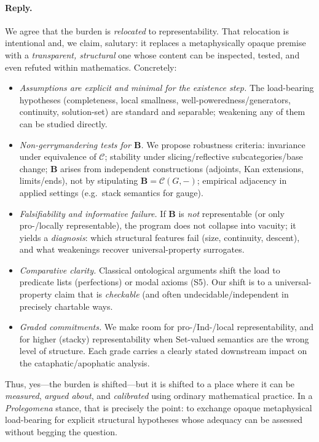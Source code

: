 \documentclass[11pt]{article}
\theoremstyle{upright}
\begin{document}
\paragraph{Reply.}
We agree that the burden is \emph{relocated} to representability. That relocation is intentional and, we claim, salutary: it replaces a metaphysically opaque premise with a \emph{transparent, structural} one whose content can be inspected, tested, and even refuted within mathematics. Concretely:
\begin{itemize}[leftmargin=2em]
  \item \emph{Assumptions are explicit and minimal for the existence step.} The load-bearing hypotheses (completeness, local smallness, well-poweredness/generators, continuity, solution-set) are standard and separable; weakening any of them can be studied directly.
  \item \emph{Non-gerrymandering tests for \(\mathbf B\).} We propose robustness criteria: invariance under equivalence of \(\mathcal C\); stability under slicing/reflective subcategories/base change; \(\mathbf B\) arises from independent constructions (adjoints, Kan extensions, limits/ends), not by stipulating \(\mathbf B=\mathcal C(G,-)\); empirical adjacency in applied settings (e.g.\ stack semantics for gauge).
  \item \emph{Falsifiability and informative failure.} If \(\mathbf B\) is \emph{not} representable (or only pro-/locally representable), the program does not collapse into vacuity; it yields a \emph{diagnosis}: which structural features fail (size, continuity, descent), and what weakenings recover universal-property surrogates.
  \item \emph{Comparative clarity.} Classical ontological arguments shift the load to predicate lists (perfections) or modal axioms (S5). Our shift is to a universal-property claim that is \emph{checkable} (and often undecidable/independent in precisely chartable ways.
  \item \emph{Graded commitments.} We make room for pro-/Ind-/local representability, and for higher (stacky) representability when Set-valued semantics are the wrong level of structure. Each grade carries a clearly stated downstream impact on the cataphatic/apophatic analysis.
\end{itemize}
Thus, yes—the burden is shifted—but it is shifted to a place where it can be \emph{measured}, \emph{argued about}, and \emph{calibrated} using ordinary mathematical practice. In a \emph{Prolegomena} stance, that is precisely the point: to exchange opaque metaphysical load-bearing for explicit structural hypotheses whose adequacy can be assessed without begging the question.
\end{document}
